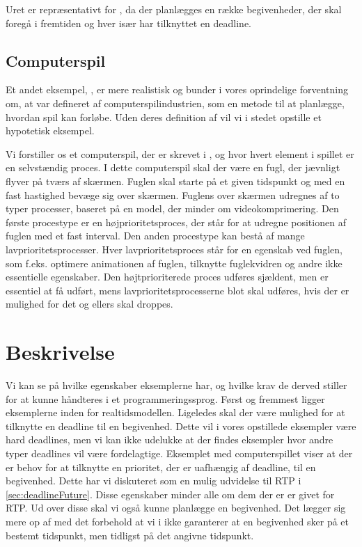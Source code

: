Uret er repræsentativt for \is, da der planlægges en række begivenheder, der skal foregå i fremtiden og hver især har tilknyttet en deadline.

\subsection{Computerspil}
Et andet eksempel, , er mere realistisk og bunder i vores oprindelige forventning om, at \is  var defineret af computerspilindustrien, som en metode til at planlægge, hvordan spil kan forløbe. Uden deres definition af \is vil vi i stedet opstille et hypotetisk eksempel. 

Vi forstiller os et computerspil, der er skrevet i \pycsp, og hvor hvert element i spillet er en selvstændig proces. I dette computerspil skal der være en fugl, der jævnligt flyver på tværs af skærmen. Fuglen skal starte på et given tidspunkt og med en fast hastighed bevæge sig over skærmen. Fuglens  over skærmen udregnes af to typer processer, baseret på en model, der minder om videokomprimering. Den første procestype er en højprioritetsproces, der står for at udregne positionen af fuglen med  et fast interval. Den anden procestype kan bestå af mange lavprioritetsprocesser. Hver lavprioritetsproces står for en egenskab ved fuglen, som  f.eks. optimere animationen af fuglen, tilknytte fuglekvidren og andre ikke essentielle egenskaber. Den højtprioriterede proces udføres sjældent, men er essentiel at få udført, mens lavprioritetsprocesserne blot skal udføres, hvis der er mulighed for det og ellers skal droppes.

\section{Beskrivelse}
Vi kan se på hvilke egenskaber eksemplerne har, og hvilke krav de derved stiller for at kunne håndteres i et programmeringssprog. Først og fremmest ligger eksemplerne  inden for realtidsmodellen. Ligeledes skal der være mulighed for at tilknytte en deadline til en begivenhed. Dette vil i vores opstillede eksempler være hard deadlines, men vi kan ikke udelukke at der findes eksempler hvor andre typer deadlines vil være fordelagtige. Eksemplet med computerspillet viser at der er behov for at tilknytte en prioritet, der er uafhængig af deadline, til en begivenhed. Dette har vi diskuteret som en mulig udvidelse til RTP i \cref{sec:deadlineFuture}. Disse egenskaber minder alle om dem der er er givet for RTP. Ud over disse skal vi også kunne planlægge en begivenhed. Det lægger sig mere op af \des med det forbehold at vi i \is ikke garanterer at en begivenhed sker på et bestemt tidspunkt, men tidligst på det angivne tidspunkt.  

